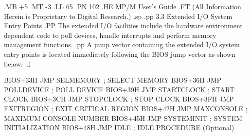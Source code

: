 .MB +5
.MT -3
.LL 65
.PN 102
.HE MP/M User's Guide
.FT   (All Information Herein is Proprietary to Digital Research.)
.sp
.pp
3.3 Extended I/O System Entry Points
.PP
The extended I/O facilities include the hardware environment dependent
code to poll devices, handle interrupts and perform memory
management functions.
.pp
A jump vector containing the extended I/O system entry points
is located immediately following the BIOS jump vector as shown
below:
.li

   BIOS+33H    JMP SELMEMORY    ; SELECT MEMORY
   BIOS+36H    JMP POLLDEVICE   ; POLL DEVICE
   BIOS+39H    JMP STARTCLOCK   ; START CLOCK
   BIOS+3CH    JMP STOPCLOCK    ; STOP CLOCK
   BIOS+3FH    JMP EXITREGION   ; EXIT CRITICAL REGION
   BIOS+42H    JMP MAXCONSOLE   ; MAXIMUM CONSOLE NUMBER
   BIOS+45H    JMP SYSTEMINIT   ; SYSTEM INITIALIZATION
   BIOS+48H    JMP IDLE         ; IDLE PROCEDURE (Optional)

